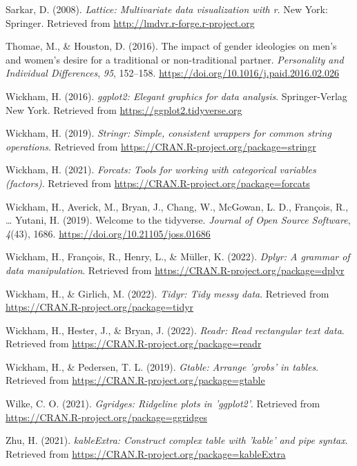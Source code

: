 \documentclass[
  man]{apa6}
\newlength{\cslhangindent}
\newlength{\cslentryspacingunit} %
\newenvironment{CSLReferences}[2] %
 {%
  \setlength{\parindent}{0pt}
  \ifodd #1
  \let\oldpar\par
  \def\par{\hangindent=\cslhangindent\oldpar}
  \fi
  \setlength{\parskip}{#2\cslentryspacingunit}
 }%
 {}
\begin{document}
\begin{CSLReferences}{1}{0}
\leavevmode{}%
Sarkar, D. (2008). \emph{Lattice: Multivariate data visualization with r}. New York: Springer. Retrieved from \url{http://lmdvr.r-forge.r-project.org}

\leavevmode{}%
Thomae, M., \& Houston, D. (2016). The impact of gender ideologies on men's and women's desire for a traditional or non-traditional partner. \emph{Personality and Individual Differences}, \emph{95}, 152--158. \url{https://doi.org/10.1016/j.paid.2016.02.026}

\leavevmode{}%
Wickham, H. (2016). \emph{ggplot2: Elegant graphics for data analysis}. Springer-Verlag New York. Retrieved from \url{https://ggplot2.tidyverse.org}

\leavevmode{}%
Wickham, H. (2019). \emph{Stringr: Simple, consistent wrappers for common string operations}. Retrieved from \url{https://CRAN.R-project.org/package=stringr}

\leavevmode{}%
Wickham, H. (2021). \emph{Forcats: Tools for working with categorical variables (factors)}. Retrieved from \url{https://CRAN.R-project.org/package=forcats}

\leavevmode{}%
Wickham, H., Averick, M., Bryan, J., Chang, W., McGowan, L. D., François, R., \ldots{} Yutani, H. (2019). Welcome to the {tidyverse}. \emph{Journal of Open Source Software}, \emph{4}(43), 1686. \url{https://doi.org/10.21105/joss.01686}

\leavevmode{}%
Wickham, H., François, R., Henry, L., \& Müller, K. (2022). \emph{Dplyr: A grammar of data manipulation}. Retrieved from \url{https://CRAN.R-project.org/package=dplyr}

\leavevmode{}%
Wickham, H., \& Girlich, M. (2022). \emph{Tidyr: Tidy messy data}. Retrieved from \url{https://CRAN.R-project.org/package=tidyr}

\leavevmode{}%
Wickham, H., Hester, J., \& Bryan, J. (2022). \emph{Readr: Read rectangular text data}. Retrieved from \url{https://CRAN.R-project.org/package=readr}

\leavevmode{}%
Wickham, H., \& Pedersen, T. L. (2019). \emph{Gtable: Arrange 'grobs' in tables}. Retrieved from \url{https://CRAN.R-project.org/package=gtable}

\leavevmode{}%
Wilke, C. O. (2021). \emph{Ggridges: Ridgeline plots in 'ggplot2'}. Retrieved from \url{https://CRAN.R-project.org/package=ggridges}

\leavevmode{}%
Zhu, H. (2021). \emph{kableExtra: Construct complex table with 'kable' and pipe syntax}. Retrieved from \url{https://CRAN.R-project.org/package=kableExtra}

\end{CSLReferences}

\endgroup
\end{document}
